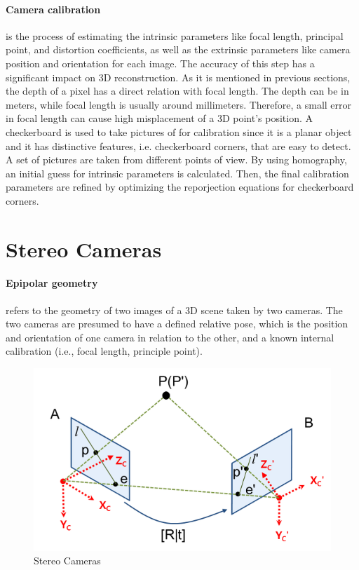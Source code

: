 \documentclass[11pt]{article}
\begin{document}
    \paragraph{Camera calibration} is the process of estimating the intrinsic parameters like focal length,
    principal point, and distortion coefficients, as well as the extrinsic parameters like camera position
    and orientation for each image. The accuracy of this step has a significant impact on 3D reconstruction.
    As it is mentioned in previous sections, the depth of a pixel has a direct relation with focal length. The depth
    can be in meters, while focal length is usually around millimeters. Therefore, a small error in focal length
    can cause high misplacement of a 3D point's position.
    A checkerboard is used to take pictures of for calibration since it is a planar object and it has distinctive features,
    i.e. checkerboard corners, that are easy to detect. A set of pictures are taken from different points of view.
    By using homography, an initial guess for intrinsic parameters is calculated. Then, the final calibration
    parameters are refined by optimizing the reporjection equations for checkerboard corners.

    \section{Stereo Cameras}
    \label{stereo_cameras}
    \paragraph{Epipolar geometry} refers to the geometry of two images of a 3D scene taken
    by two cameras. The two cameras are presumed to have a defined relative pose, which is
    the position and orientation of one camera in relation to the other, and a known internal calibration
    (i.e., focal length, principle point).

    \begin{figure}
        \centering
        \includegraphics[width=\textwidth,height=\textheight,keepaspectratio]{images/epipolar_1.png}
        \caption{Stereo Cameras}
        \label{fig:stereo_cameras}
    \end{figure}
\end{document}
